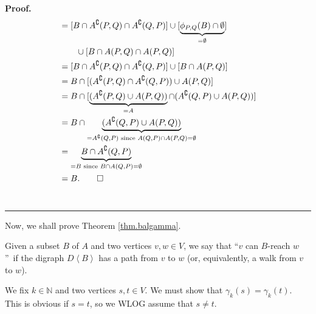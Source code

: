 \documentclass[numbers=enddot,12pt,final,onecolumn,notitlepage]{scrartcl}%
\theoremstyle{definition}
\newenvironment{proof}[1][Proof]{\noindent\textbf{#1.} }{\ \rule{0.5em}{0.5em}}
\theoremstyle{plainsl}
\begin{document}
\begin{proof}
\begin{align*}
    &= [B \cap A^{\complement}(P,Q) \cap A^{\complement}(Q,P)] \cup [\underbrace{\phi_{P,Q}(B) \cap \emptyset}_{=\emptyset}] \\
    & \ \ \ \ \ \ \cup [B \cap A(P,Q) \cap A(P,Q)] \\
    &= [B \cap A^{\complement}(P,Q) \cap A^{\complement}(Q,P)] \cup [B \cap A(P,Q)] \\
    &= B \cap [(A^{\complement}(P,Q) \cap A^{\complement}(Q,P)) \cup A(P,Q)] \\
    &= B \cap [\underbrace{(A^{\complement}(P,Q) \cup A(P,Q))}_{=A} \cap (A^{\complement}(Q,P) \cup A(P,Q))] \\
    &= B \cap \underbrace{(A^{\complement}(Q,P) \cup A(P,Q))}_{=A^{\complement}(Q,P) \text{ since } A(Q,P) \cap A(P,Q) = \emptyset} \\
    &= \underbrace{B \cap A^{\complement}(Q,P)}_{=B \text{ since } B \cap A(Q,P) = \emptyset} \\
    &= B. \qedhere
\end{align*}\end{proof}

Now, we shall prove Theorem \ref{thm.balgamma}.

Given a subset $B$ of $A$ and two vertices $v,w\in V$, we say that
\textquotedblleft$v$ can $B$-reach $w$\textquotedblright\ if the digraph
$D\left\langle B\right\rangle $ has a path from $v$ to $w$ (or, equivalently,
a walk from $v$ to $w$).

We fix $k\in\mathbb{N}$ and two vertices $s,t\in V$. We must show that
$\gamma_{k}\left(  s\right)  =\gamma_{k}\left(  t\right)  $. This is obvious
if $s=t$, so we WLOG assume that $s\neq t$.
\end{document}
